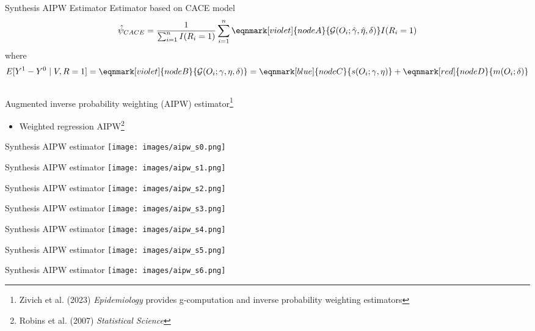 \documentclass{beamer}
\begin{document}
\begin{frame}{Synthesis AIPW Estimator}
	Estimator based on CACE model
	\[\hat{\psi}_{CACE} =  \frac{1}{\sum_{i=1}^{n} I(R_i = 1)} \sum_{i=1}^{n} \eqnmark[violet]{nodeA}{\mathcal{G}(O_i; \hat{\gamma}, \hat{\eta}, \delta)} I(R_i =1)\]
	where 
	\[E[Y^1-Y^0 \mid V,R=1] = \eqnmark[violet]{nodeB}{\mathcal{G}(O_i;\gamma, \eta, \delta)} = \eqnmark[blue]{nodeC}{s(O_i; \gamma, \eta)} + \eqnmark[red]{nodeD}{m(O_i; \delta)}\]
	~\\
	Augmented inverse probability weighting (AIPW) estimator\footnote[frame]{Zivich et al. (2023) \textit{Epidemiology} provides g-computation and inverse probability weighting estimators}
	\begin{itemize}
		\item Weighted regression AIPW\footnote[frame]{Robins et al. (2007) \textit{Statistical Science}}
	\end{itemize}	
\end{frame}

\begin{frame}{Synthesis AIPW estimator}
	\centering
	\texttt{[image: images/aipw\_s0.png]}
\end{frame}

\begin{frame}{Synthesis AIPW estimator}
	\centering
	\texttt{[image: images/aipw\_s1.png]}
\end{frame}

\begin{frame}{Synthesis AIPW estimator}
	\centering
	\texttt{[image: images/aipw\_s2.png]}
\end{frame}

\begin{frame}{Synthesis AIPW estimator}
	\centering
	\texttt{[image: images/aipw\_s3.png]}
\end{frame}

\begin{frame}{Synthesis AIPW estimator}
	\centering
	\texttt{[image: images/aipw\_s4.png]}
\end{frame}

\begin{frame}{Synthesis AIPW estimator}
	\centering
	\texttt{[image: images/aipw\_s5.png]}
\end{frame}

\begin{frame}{Synthesis AIPW estimator}
	\centering
	\texttt{[image: images/aipw\_s6.png]}
\end{frame}
\end{document}
